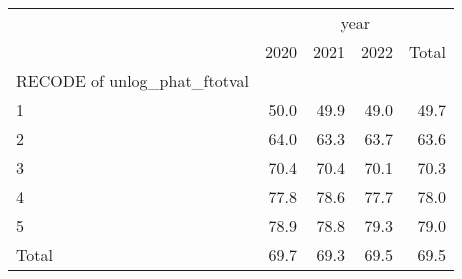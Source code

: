\begin{tabular}{lllll}
\cline{1-5}
\multicolumn{1}{c}{} &
  \multicolumn{4}{|c}{year} \\
\multicolumn{1}{c}{} &
  \multicolumn{1}{|r}{2020} &
  \multicolumn{1}{r}{2021} &
  \multicolumn{1}{r}{2022} &
  \multicolumn{1}{r}{Total} \\
\cline{1-5}
\multicolumn{1}{l}{RECODE of unlog\_phat\_ftotval} &
  \multicolumn{1}{|r}{} &
  \multicolumn{1}{r}{} &
  \multicolumn{1}{r}{} &
  \multicolumn{1}{r}{} \\
\multicolumn{1}{l}{\hspace{1em}1} &
  \multicolumn{1}{|r}{50.0} &
  \multicolumn{1}{r}{49.9} &
  \multicolumn{1}{r}{49.0} &
  \multicolumn{1}{r}{49.7} \\
\multicolumn{1}{l}{\hspace{1em}2} &
  \multicolumn{1}{|r}{64.0} &
  \multicolumn{1}{r}{63.3} &
  \multicolumn{1}{r}{63.7} &
  \multicolumn{1}{r}{63.6} \\
\multicolumn{1}{l}{\hspace{1em}3} &
  \multicolumn{1}{|r}{70.4} &
  \multicolumn{1}{r}{70.4} &
  \multicolumn{1}{r}{70.1} &
  \multicolumn{1}{r}{70.3} \\
\multicolumn{1}{l}{\hspace{1em}4} &
  \multicolumn{1}{|r}{77.8} &
  \multicolumn{1}{r}{78.6} &
  \multicolumn{1}{r}{77.7} &
  \multicolumn{1}{r}{78.0} \\
\multicolumn{1}{l}{\hspace{1em}5} &
  \multicolumn{1}{|r}{78.9} &
  \multicolumn{1}{r}{78.8} &
  \multicolumn{1}{r}{79.3} &
  \multicolumn{1}{r}{79.0} \\
\multicolumn{1}{l}{\hspace{1em}Total} &
  \multicolumn{1}{|r}{69.7} &
  \multicolumn{1}{r}{69.3} &
  \multicolumn{1}{r}{69.5} &
  \multicolumn{1}{r}{69.5} \\
\cline{1-5}
\end{tabular}
